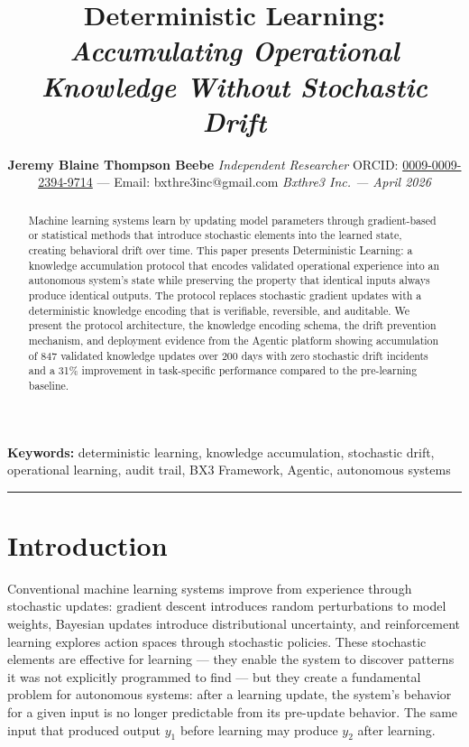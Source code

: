 \documentclass[12pt]{article}
\title{
    \vspace{1.2cm}
    {\LARGE \textbf{Deterministic Learning:}} \break
    {\large \textit{Accumulating Operational Knowledge Without Stochastic Drift}}
}
\author{
    \textbf{Jeremy Blaine Thompson Beebe} \break
    \textit{Independent Researcher} \break
    ORCID: \href{https://orcid.org/0009-0009-2394-9714}{0009-0009-2394-9714} --- Email: bxthre3inc@gmail.com \break
    \textit{Bxthre3 Inc. --- April 2026}
}
\begin{document}
\maketitle
\thispagestyle{fancy}

\begin{abstract}\noindent
Machine learning systems learn by updating model parameters through gradient-based or statistical methods that introduce stochastic elements into the learned state, creating behavioral drift over time. This paper presents Deterministic Learning: a knowledge accumulation protocol that encodes validated operational experience into an autonomous system's state while preserving the property that identical inputs always produce identical outputs. The protocol replaces stochastic gradient updates with a deterministic knowledge encoding that is verifiable, reversible, and auditable. We present the protocol architecture, the knowledge encoding schema, the drift prevention mechanism, and deployment evidence from the Agentic platform showing accumulation of 847 validated knowledge updates over 200 days with zero stochastic drift incidents and a 31\% improvement in task-specific performance compared to the pre-learning baseline.
\end{abstract}

\vspace{0.5em}
\noindent\textbf{Keywords:} deterministic learning, knowledge accumulation, stochastic drift, operational learning, audit trail, BX3 Framework, Agentic, autonomous systems

\vspace{1em}
\hrule
\vspace{1em}

\onehalfspacing

\section{Introduction}
\label{sec:intro}

Conventional machine learning systems improve from experience through stochastic updates: gradient descent introduces random perturbations to model weights, Bayesian updates introduce distributional uncertainty, and reinforcement learning explores action spaces through stochastic policies. These stochastic elements are effective for learning --- they enable the system to discover patterns it was not explicitly programmed to find --- but they create a fundamental problem for autonomous systems: after a learning update, the system's behavior for a given input is no longer predictable from its pre-update behavior. The same input that produced output $y_1$ before learning may produce $y_2$ after learning.
\end{document}
